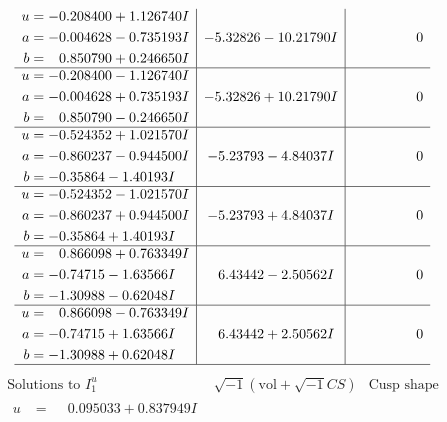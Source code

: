 \documentclass[1p]{elsarticle_modified}
\theoremstyle{definition}
\newcommand{\I}{\sqrt{-1}}
\begin{document}
$$\begin{array}{c|c|c}
\begin{aligned}
u &= -0.208400 + 1.126740 I \\
a &= -0.004628 - 0.735193 I \\
b &= \phantom{-}0.850790 + 0.246650 I\end{aligned}
 & -5.32826 - 10.21790 I & \phantom{-0.000000 } 0 \\ \hline\begin{aligned}
u &= -0.208400 - 1.126740 I \\
a &= -0.004628 + 0.735193 I \\
b &= \phantom{-}0.850790 - 0.246650 I\end{aligned}
 & -5.32826 + 10.21790 I & \phantom{-0.000000 } 0 \\ \hline\begin{aligned}
u &= -0.524352 + 1.021570 I \\
a &= -0.860237 - 0.944500 I \\
b &= -0.35864 - 1.40193 I\end{aligned}
 & -5.23793 - 4.84037 I & \phantom{-0.000000 } 0 \\ \hline\begin{aligned}
u &= -0.524352 - 1.021570 I \\
a &= -0.860237 + 0.944500 I \\
b &= -0.35864 + 1.40193 I\end{aligned}
 & -5.23793 + 4.84037 I & \phantom{-0.000000 } 0 \\ \hline\begin{aligned}
u &= \phantom{-}0.866098 + 0.763349 I \\
a &= -0.74715 - 1.63566 I \\
b &= -1.30988 - 0.62048 I\end{aligned}
 & \phantom{-}6.43442 - 2.50562 I & \phantom{-0.000000 } 0 \\ \hline\begin{aligned}
u &= \phantom{-}0.866098 - 0.763349 I \\
a &= -0.74715 + 1.63566 I \\
b &= -1.30988 + 0.62048 I\end{aligned}
 & \phantom{-}6.43442 + 2.50562 I & \phantom{-0.000000 } 0\\
 \hline 
 \end{array}$$\newpage$$\begin{array}{c|c|c}  
\text{Solutions to }I^u_{1}& \I (\text{vol} + \sqrt{-1}CS) & \text{Cusp shape}\\
 \hline 
\begin{aligned}
u &= \phantom{-}0.095033 + 0.837949 I \\

\end{aligned}
\end{array}$$
\end{document}
